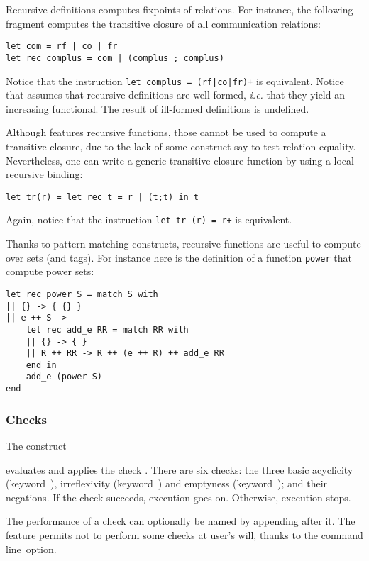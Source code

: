 Recursive definitions computes fixpoints of relations.
For instance, the following fragment computes the transitive closure of
all communication relations:
\begin{verbatim}
let com = rf | co | fr
let rec complus = com | (complus ; complus)
\end{verbatim}
Notice that the instruction \verb-let complus = (rf|co|fr)+- is equivalent.
Notice that \herd{} assumes that recursive definitions are well-formed,
\emph{i.e.} that they yield an increasing functional.
The result of ill-formed definitions is undefined.

Although \herd{} features recursive functions, those cannot be used
to compute a transitive closure, due to the lack of some construct
say to test relation equality. Nevertheless, one can
write a generic transitive closure
function by using a local recursive binding:
\begin{verbatim}
let tr(r) = let rec t = r | (t;t) in t
\end{verbatim}
Again, notice that the instruction \verb-let tr (r) = r+- is equivalent.

Thanks to pattern matching constructs,
recursive functions are useful to compute over sets (and tags).
For instance here is the definition of a function \texttt{power} that compute
power sets:
\begin{verbatim}
let rec power S = match S with
|| {} -> { {} }
|| e ++ S ->
    let rec add_e RR = match RR with
    || {} -> { }
    || R ++ RR -> R ++ (e ++ R) ++ add_e RR
    end in
    add_e (power S)
end
\end{verbatim}

\subsubsection*{\label{sec:check}Checks}
The construct
\begin{center}\end{center}
evaluates  and applies the check .
There are six checks: the three basic acyclicity (keyword~),
irreflexivity (keyword~)
and emptyness (keyword~); and their
negations.
If the check succeeds, execution goes on. Otherwise, execution stops.

\label{name:check:def}The performance of a
check can optionally be named  by appending
 after it.
The feature permits not to perform some checks at user's will,
thanks to the 
command line~option.

